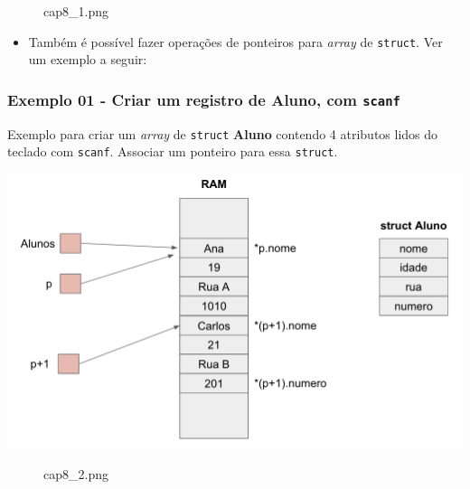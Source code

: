 \documentclass[12pt,a4paper]{article}
\providecommand{\tightlist}{%
      \setlength{\itemsep}{0pt}\setlength{\parskip}{0pt}}
\begin{document}
    \begin{figure}
\centering
\caption{cap8\_1.png}
\end{figure}

    \begin{itemize}
\tightlist
\item
  Também é possível fazer operações de ponteiros para \emph{array} de
  \texttt{struct}. Ver um exemplo a seguir:
\end{itemize}

    \hypertarget{exemplo-01---criar-um-registro-de-aluno-com-scanf}{%
\subsubsection{\texorpdfstring{Exemplo 01 - Criar um registro de Aluno,
com
\texttt{scanf}}{Exemplo 01 - Criar um registro de Aluno, com scanf}}\label{exemplo-01---criar-um-registro-de-aluno-com-scanf}}

Exemplo para criar um \emph{array} de \texttt{struct} \textbf{Aluno}
contendo 4 atributos lidos do teclado com \texttt{scanf}. Associar um
ponteiro para essa \texttt{struct}.

\includegraphics{"figs/cap8_2.png"}

    \begin{figure}
\centering
\caption{cap8\_2.png}
\end{figure}
\end{document}
